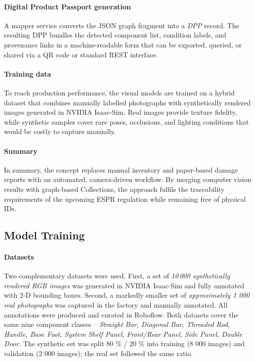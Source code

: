 \documentclass[3p,times,procedia]{elsarticle}
\begin{document}
\paragraph{Digital Product Passport generation}
A mapper service converts the JSON graph fragment into a \emph{DPP} record. The resulting DPP bundles the detected component list, condition labels, and provenance links in a machine-readable form that can be exported, queried, or shared via a QR code or standard REST interface.

\paragraph{Training data}
To reach production performance, the visual models are trained on a hybrid dataset that combines manually labelled photographs with synthetically rendered images generated in NVIDIA Isaac-Sim.  Real images provide texture fidelity, while synthetic samples cover rare poses, occlusions, and lighting conditions that would be costly to capture manually.

\paragraph{Summary}
In summary, the concept replaces manual inventory and paper-based damage reports with an automated, camera-driven workflow.  By merging computer vision results with graph-based Collections, the approach fulfils the traceability requirements of the upcoming ESPR regulation while remaining free of physical IDs.

\subsection{Model Training}
\label{sec:model-training}

\paragraph{Datasets}
Two complementary datasets were used.  
First, a set of \emph{10\,000 synthetically rendered RGB images} was generated in NVIDIA Isaac-Sim and fully annotated with 2-D bounding boxes.  
Second, a markedly smaller set of \emph{approximately 1 000 real photographs} was captured in the factory and manually annotated.  
All annotations were produced and curated in Roboflow.  
Both datasets cover the same nine component classes -- \textit{Straight Bar, Diagonal Bar, Threaded Rod, Handle, Base Foot, System Shelf Panel, Front/Rear Panel, Side Panel, Double Door}.  
The synthetic set was split 80 \% / 20 \% into training (8 000 images) and validation (2 000 images); the real set followed the same ratio.
\end{document}
